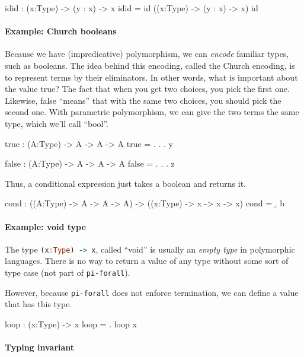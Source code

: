 \documentclass{article}
\newcommand\cd[1]{\lstinline[language=Haskell]{#1}}
\newcommand\pif{\texttt{pi-forall}\xspace}
\theoremstyle{definition}
\begin{document}
\begin{piforall}
    idid : (x:Type) -> (y : x) -> x
    idid = id ((x:Type) -> (y : x) -> x) id
\end{piforall}

\paragraph{Example: Church booleans}

Because we have (impredicative) polymorphism, we can \emph{encode} familiar
types, such as booleans. The idea behind this encoding, called the Church
encoding, is to represent terms by their eliminators. In other words, what is
important about the value true?  The fact that when you get two choices, you
pick the first one.  Likewise, false ``means'' that with the same two choices,
you should pick the second one.  With parametric polymorphism, we can give the
two terms the same type, which we'll call ``bool''.

\begin{piforall}
true : (A:Type) -> A -> A -> A
true = \x. \y. \z. y

false : (A:Type) -> A -> A -> A
false = \x. \y. \z. z
\end{piforall}

\noindent
Thus, a conditional expression just takes a boolean and returns it.

\begin{piforall}
cond : ((A:Type) -> A -> A -> A) -> ((x:Type) -> x -> x -> x)
cond = \b. b
\end{piforall}

\paragraph{Example: void type}

The type \cd{(x:Type) -> x}, called ``void'' is usually an \emph{empty type}
in polymorphic languages.  There is no way to return a value of any type without
some sort of type case (not part of \pif).

However, because \pif does not enforce termination, we can define a value that
has this type.

\begin{piforall}
loop : (x:Type) -> x
loop = \x . loop x
\end{piforall}

\paragraph{Typing invariant}
\end{document}
